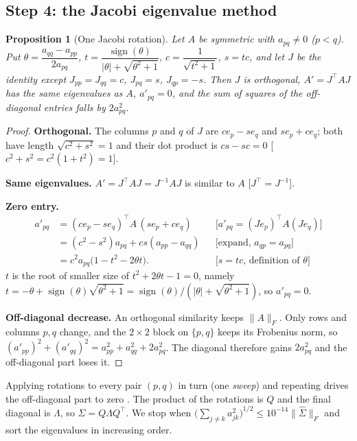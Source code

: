 \documentclass[11pt]{article}
\newtheorem{proposition}[theorem]{Proposition}
\theoremstyle{definition}
\newcommand{\T}{^{\top}}
\newcommand{\rul}[1]{\text{[#1]}}
\begin{document}
\subsection{Step 4: the Jacobi eigenvalue method}
\begin{proposition}[One Jacobi rotation]\label{prop:jacobi}
Let $A$ be symmetric with $a_{pq}\neq0$ ($p<q$). Put $\theta=\dfrac{a_{qq}-a_{pp}}{2a_{pq}}$, $t=\dfrac{\operatorname{sign}(\theta)}{|\theta|+\sqrt{\theta^2+1}}$, $c=\dfrac1{\sqrt{t^2+1}}$, $s=tc$, and let $J$ be the identity except $J_{pp}=J_{qq}=c$, $J_{pq}=s$, $J_{qp}=-s$. Then $J$ is orthogonal, $A'=J\T AJ$ has the same eigenvalues as $A$, $a'_{pq}=0$, and the sum of squares of the off-diagonal entries falls by $2a_{pq}^2$.
\end{proposition}
\begin{proof}
\textbf{Orthogonal.} The columns $p$ and $q$ of $J$ are $ce_p-se_q$ and $se_p+ce_q$; both have length $\sqrt{c^2+s^2}=1$ and their dot product is $cs-sc=0$ [$c^2+s^2=c^2(1+t^2)=1$].

\textbf{Same eigenvalues.} $A'=J\T AJ=J^{-1}AJ$ is similar to $A$ [$J\T=J^{-1}$].

\textbf{Zero entry.}
\begin{align*}
a'_{pq} &= (ce_p-se_q)\T A\,(se_p+ce_q) && \rul{$a'_{pq}=(Je_p)\T A(Je_q)$}\\
&= (c^2-s^2)a_{pq}+cs(a_{pp}-a_{qq}) && \rul{expand, $a_{qp}=a_{pq}$}\\
&= c^2a_{pq}\big(1-t^2-2\theta t\big). && \rul{$s=tc$, definition of $\theta$}
\end{align*}
$t$ is the root of smaller size of $t^2+2\theta t-1=0$, namely $t=-\theta+\operatorname{sign}(\theta)\sqrt{\theta^2+1}=\operatorname{sign}(\theta)/(|\theta|+\sqrt{\theta^2+1})$, so $a'_{pq}=0$.

\textbf{Off-diagonal decrease.} An orthogonal similarity keeps $\|A\|_F$. Only rows and columns $p,q$ change, and the $2\times2$ block on $\{p,q\}$ keeps its Frobenius norm, so $(a'_{pp})^2+(a'_{qq})^2=a_{pp}^2+a_{qq}^2+2a_{pq}^2$. The diagonal therefore gains $2a_{pq}^2$ and the off-diagonal part loses it.
\end{proof}
\noindent Applying rotations to every pair $(p,q)$ in turn (one \emph{sweep}) and repeating drives the off-diagonal part to zero \cite{gvl}. The product of the rotations is $Q$ and the final diagonal is $\Lambda$, so $\hat\Sigma=Q\Lambda Q\T$. We stop when $\big(\sum_{j\neq k}a_{jk}^2\big)^{1/2}\le10^{-14}\|\hat\Sigma\|_F$ and sort the eigenvalues in increasing order.
\end{document}
